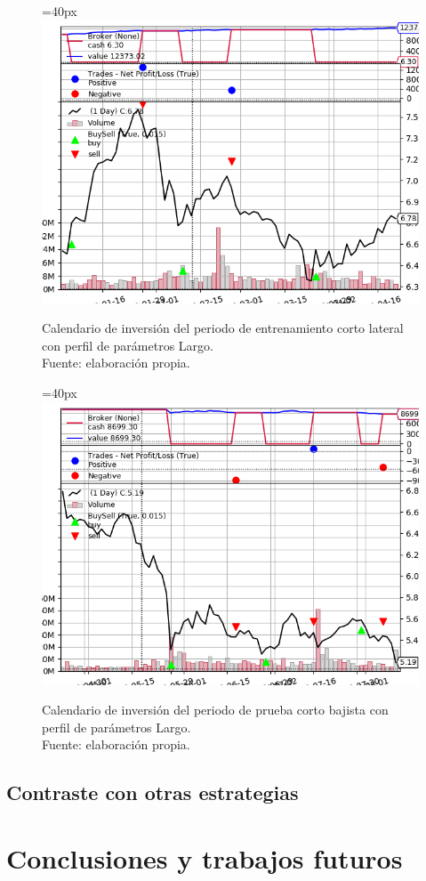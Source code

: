       	\begin{figure}[H]
      		\centering\leftskip=40px
      		\includegraphics[scale=0.66]{imagenes/S_Large_train.png}
      		\caption[Calendario de inversi\'on del periodo de entrenamiento corto lateral]{Calendario de inversi\'on del periodo de entrenamiento corto lateral con perfil de par\'ametros Largo.\\ Fuente: elaboraci\'on propia.}
      		\label{fig:short_period_downtrain}
      	\end{figure}
      	
     	\begin{figure}[H]
     		\centering\leftskip=40px
     		\includegraphics[scale=0.66]{imagenes/S_Large_test.png}
     		\caption[Calendario de inversi\'on del periodo de prueba corto bajista]{Calendario de inversi\'on del periodo de prueba corto bajista con perfil de par\'ametros Largo.\\ Fuente: elaboraci\'on propia.}
     		\label{fig:short_period_downtest}
     	\end{figure} 

\subsection{Contraste con otras estrategias}

\newpage
\section{Conclusiones y trabajos futuros}